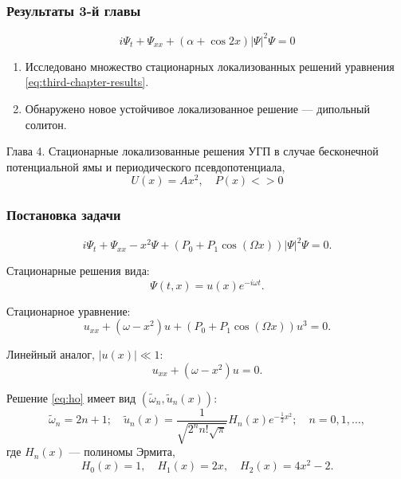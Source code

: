 \documentclass [10pt] {beamer}
\begin{document}
\begin{frame}
	\frametitle{Результаты 3-й главы}
	
	\begin{equation}
		i \Psi_t + \Psi_{xx} + (\alpha + \cos 2x) |\Psi|^2 \Psi = 0
		\label{eq:third-chapter-results}
	\end{equation}
	
	\begin{enumerate}
		\item Исследовано множество стационарных локализованных решений уравнения \eqref{eq:third-chapter-results}.
		\item Обнаружено новое устойчивое локализованное решение --- дипольный солитон.
	\end{enumerate}
\end{frame}

\begin{frame}
	\begin{center}
		{\LARGE Глава 4. Стационарные локализованные решения УГП в случае бесконечной потенциальной ямы и периодического псевдопотенциала, $$U(x) = Ax^2, \quad P(x) <> 0$$}
	\end{center}
\end{frame}

\begin{frame}
	\frametitle{Постановка задачи}
	
	\begin{equation}
		i \Psi_t + \Psi_{xx} - x^2 \Psi + (P_0 + P_1 \cos (\Omega x)) |\Psi|^2 \Psi = 0.
	\end{equation}
	
	Стационарные решения вида:
	\begin{equation}
		\Psi(t, x) = u(x) e^{-i \omega t}.
	\end{equation}
	
	Стационарное уравнение:
	\begin{equation}
		u_{xx} + (\omega - x^2) u + (P_0 + P_1 \cos (\Omega x)) u^3 = 0.
	\end{equation}
	
	Линейный аналог, $|u(x)| \ll 1$:
	\begin{equation}
		u_{xx} + (\omega - x^2) u = 0.
	\label{eq:ho}
	\end{equation}
	
	Решение \eqref{eq:ho} имеет вид $(\tilde{\omega}_n, \tilde{u}_n(x))$:
	\begin{equation}
		\tilde{\omega}_n = 2n + 1; \quad \tilde{u}_n(x) = \dfrac{1}{\sqrt{2^n n! \sqrt{\pi}}} H_n(x) e^{-\frac{1}{2} x^2}; \quad n = 0, 1, \dots,
	\end{equation}
	где $H_n(x)$ --- полиномы Эрмита,
	\begin{equation*}
		H_0(x) = 1, \quad H_1(x) = 2x, \quad H_2(x) = 4x^2 - 2.	
	\end{equation*}
\end{frame}
\end{document}
